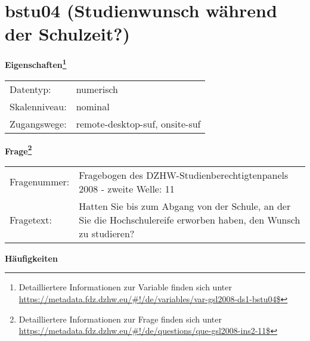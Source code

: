 
    \setcounter{footnote}{0}

    \vspace*{-1.8cm}
	\section{bstu04 (Studienwunsch während der Schulzeit?)}
	\label{section:bstu04}



    \vspace*{0.5cm}
    \noindent\textbf{Eigenschaften\footnote{Detailliertere Informationen zur Variable finden sich unter
		\url{https://metadata.fdz.dzhw.eu/\#!/de/variables/var-gsl2008-ds1-bstu04$}}}\\
	\begin{tabularx}{\hsize}{@{}lX}
	Datentyp: & numerisch \\
	Skalenniveau: & nominal \\
	Zugangswege: &
	  remote-desktop-suf, 
	  onsite-suf
 \\
    \end{tabularx}



				\vspace*{0.5cm}
                \noindent\textbf{Frage\footnote{Detailliertere Informationen zur Frage finden sich unter
		              \url{https://metadata.fdz.dzhw.eu/\#!/de/questions/que-gsl2008-ins2-11$}}}\\
				\begin{tabularx}{\hsize}{@{}lX}
					Fragenummer: &
					  Fragebogen des DZHW-Studienberechtigtenpanels 2008 - zweite Welle:
					  11
 \\
					Fragetext: & Hatten Sie bis zum Abgang von der Schule, an der Sie die Hochschulereife erworben haben, den Wunsch zu studieren? \\
				\end{tabularx}





        		\vspace*{0.5cm}
                \noindent\textbf{Häufigkeiten}

